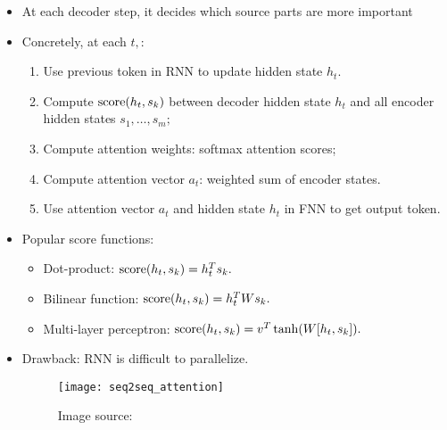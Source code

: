 \begin{itemize}
\item 
At each decoder step, it decides which source parts are more important

\item Concretely, at each $t,$:
	\begin{enumerate}[label=(\roman*)]
	\item
	Use previous token in RNN to update hidden state $h_t.$
	
	\item 
	Compute  $\operatorname{score}(h_t,s_k)$ between decoder hidden state $h_t$ and all encoder hidden states $s_1,\ldots,s_m;$
	
	\item 
	Compute attention weights: softmax attention scores;
	
	\item 
	Compute attention vector $a_t$: weighted sum of encoder states.
	
	\item 
	Use attention vector $a_t$ and hidden state $h_t$ in FNN to get output token.
	\end{enumerate}

\item Popular score functions:
	\begin{itemize}
	\item 
	Dot-product: $\operatorname{score}(h_t,s_k) = h_t^T s_k.$
	
	\item 
	Bilinear function: $\operatorname{score}(h_t,s_k) = h_t^T W s_k.$
	
	\item 
	Multi-layer perceptron: $\operatorname{score}(h_t,s_k) = v^T\tanh(W[h_t,s_k]).$
	\end{itemize}

\item Drawback: RNN is difficult to parallelize.

\begin{figure}[ht]
	\centering
	\texttt{[image: seq2seq\_attention]}
	\caption*{Image source: \cite{seq2seq_voita}}
\end{figure}
\end{itemize}